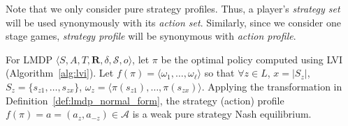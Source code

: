Note that we only consider pure strategy profiles. Thus, a player's \emph{strategy set} will be used synonymously with its \emph{action set}. Similarly, since we consider one stage games, \emph{strategy profile} will be synonymous with \emph{action profile}.


\begin{proposition}
    \label{prop:lvi_nash}
    For LMDP $\langle S, A, T, \mathbf{R}, \delta, \mathcal{S}, o \rangle$, let $\pi$ be the optimal policy computed using LVI (Algorithm~\ref{alg:lvi}). Let $f(\pi) = \langle \omega_1, \ldots, \omega_\ell \rangle$ so that $\forall z \in L$, $x = |S_z|$, $S_z = \{ s_{z1}, \ldots, s_{zx} \}$, $\omega_z = \langle \pi(s_{z1}), \ldots, \pi(s_{zx}) \rangle$. Applying the transformation in Definition~\ref{def:lmdp_normal_form}, the strategy (action) profile $f(\pi) = a = (a_z, a_{-z}) \in \mathcal{A}$ is a weak pure strategy Nash equilibrium.
\end{proposition}

